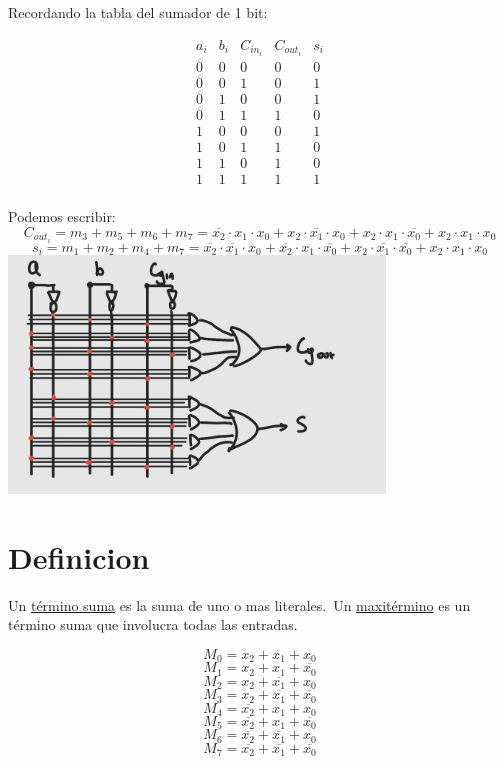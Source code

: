 \documentclass{report}
\begin{document}
Recordando la tabla del sumador de 1 bit:


$$\begin{array}{ccc|cc}
		a_i & b_i & C_{in_i} & C_{out_i} & s_i \\ \hline
		0   & 0   & 0        & 0         & 0   \\
		0   & 0   & 1        & 0         & 1   \\
		0   & 1   & 0        & 0         & 1   \\
		0   & 1   & 1        & 1         & 0   \\
		1   & 0   & 0        & 0         & 1   \\
		1   & 0   & 1        & 1         & 0   \\
		1   & 1   & 0        & 1         & 0   \\
		1   & 1   & 1        & 1         & 1   \\
	\end{array}$$


Podemos escribir:
$$ C_{out_i} = m_3 + m_5 + m_6 + m_7 =
	\overline{x_2} \cdot x_1  \cdot x_0 +
	x_2  \cdot \overline{x_1} \cdot x_0 +
	x_2  \cdot x_1  \cdot \overline{x_0} +
	x_2  \cdot x_1  \cdot x_0
$$
$$ s_i = m_1 + m_2 + m_4 + m_7 =
	\overline{x_2} \cdot \overline{x_1} \cdot x_0 +
	\overline{x_2} \cdot x_1  \cdot \overline{x_0} +
	x_2  \cdot \overline{x_1} \cdot \overline{x_0} +
	x_2  \cdot x_1  \cdot x_0
$$
\includegraphics[width=10cm]{../Assets/sumador_de_1bit.jpeg}

\section{Definicion}

Un \underline{término suma} es la suma de uno o mas literales.\
Un \underline{maxitérmino} es un término suma que involucra todas las entradas.

$$M_0 = x_2  + x_1  + x_0$$
$$M_1 = x_2  + x_1  + \overline{x_0}$$
$$M_2 = x_2  + \overline{x_1} + x_0$$
$$M_3 = x_2  + \overline{x_1} + \overline{x_0}$$
$$M_4 = \overline{x_2} + x_1  + x_0$$
$$M_5 = \overline{x_2} + x_1  + \overline{x_0}$$
$$M_6 = \overline{x_2} + \overline{x_1} + x_0$$
$$M_7 = \overline{x_2} + \overline{x_1} + \overline{x_0}$$
\end{document}
